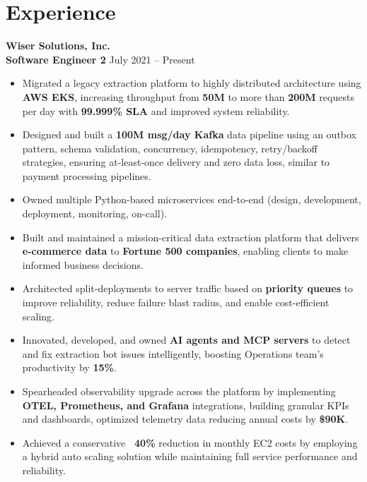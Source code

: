 \documentclass[11pt]{article}       %
\begin{document}
\section*{Experience}

\textbf{Wiser Solutions, Inc.} \\

\textbf{Software Engineer 2} \hfill July 2021 -- Present \\

\begin{itemize}
  \item Migrated a legacy extraction platform to highly distributed architecture using \textbf{AWS EKS}, increasing throughput from \textbf{50M} to more than \textbf{200M} requests per day with \textbf{99.999\% SLA} and improved system reliability. \\
  \item Designed and built a \textbf{100M msg/day Kafka} data pipeline using an outbox pattern, schema validation, concurrency, idempotency, retry/backoff strategies, ensuring at-least-once delivery and zero data loss, similar to payment processing pipelines. \\
  \item Owned multiple Python-based microservices end-to-end (design, development, deployment, monitoring, on-call). \\
  \item Built and maintained a mission-critical data extraction platform that delivers \textbf{e-commerce data} to \textbf{Fortune 500 companies}, enabling clients to make informed business decisions. \\
  \item Architected split-deployments to server traffic based on \textbf{priority queues} to improve reliability, reduce failure blast radius, and enable cost-efficient scaling. \\
  \item Innovated, developed, and owned \textbf{AI agents and MCP servers} to detect and fix extraction bot issues intelligently, boosting Operations team's productivity by \textbf{15\%}. \\
  \item Spearheaded observability upgrade across the platform by implementing \textbf{OTEL, Prometheus, and Grafana} integrations, building granular KPIs and dashboards, optimized telemetry data reducing annual costs by \textbf{\$90K}. \\
  \item Achieved a conservative \textbf{~40\%} reduction in monthly EC2 costs by employing a hybrid auto scaling solution while maintaining full service performance and reliability. \\

\end{itemize}
\end{document}
